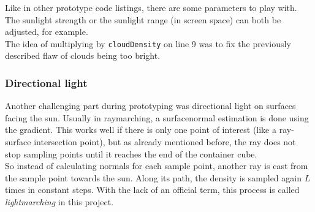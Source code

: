 \noindent
Like in other prototype code listings, there are some \gls{parameters} to play with. The sunlight strength or the sunlight range (in screen space) can both be adjusted, for example.
\\
The idea of multiplying by \lstinline[language=HLSL]{cloudDensity} on line 9 was to fix the previously described flaw of clouds being too bright. 

\clearpage
\subsubsection{Directional light}
Another challenging part during prototyping was directional light on surfaces facing the sun. Usually in \gls{raymarching}, a \gls{surfacenormal} estimation is done using the gradient.
This works well if there is only one point of interest (like a ray-surface intersection point), but as already mentioned before, the ray does not stop sampling points until it reaches the end of the container cube.
\\
So instead of calculating normals for each sample point, another ray is cast from the sample point towards the sun.
Along its path, the density is sampled again $L$ times in constant steps. With the lack of an official term, this process is called \textit{\gls{lightmarching}} in this project.

